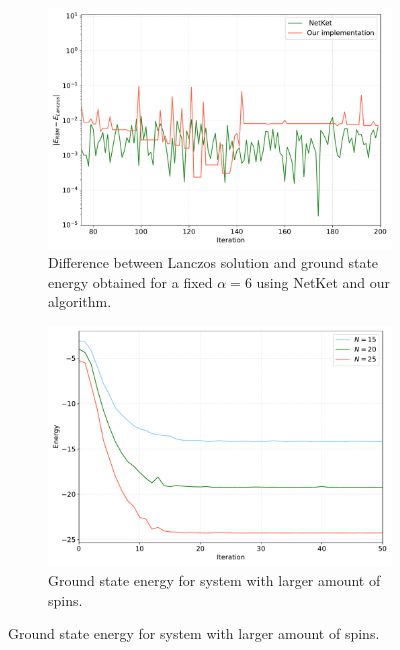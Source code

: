 \documentclass[a4paper,11pt]{article}
\begin{document}
\begin{figure}[htb]
\begin{subfigure}[t]{0.45\textwidth}
    \end{subfigure}
    \begin{subfigure}[t]{0.45\textwidth} 
        \centering
        \includegraphics[width=\textwidth]{./figure/Comparison_Net_Nostro.pdf}
        \caption{Difference between Lanczos solution and ground state energy obtained for a fixed $\alpha = 6$ using NetKet and our algorithm.}
        \label{fig:Net_nostro}
    \end{subfigure}
    \begin{subfigure}[t]{0.45\textwidth} 
        \centering
        \includegraphics[width=\textwidth]{./figure/Comparison_NetKet.pdf}
        \caption{Ground state energy for system with larger amount of spins.}
        \label{fig:N}
    \end{subfigure}
    
\end{figure}
\end{document}
